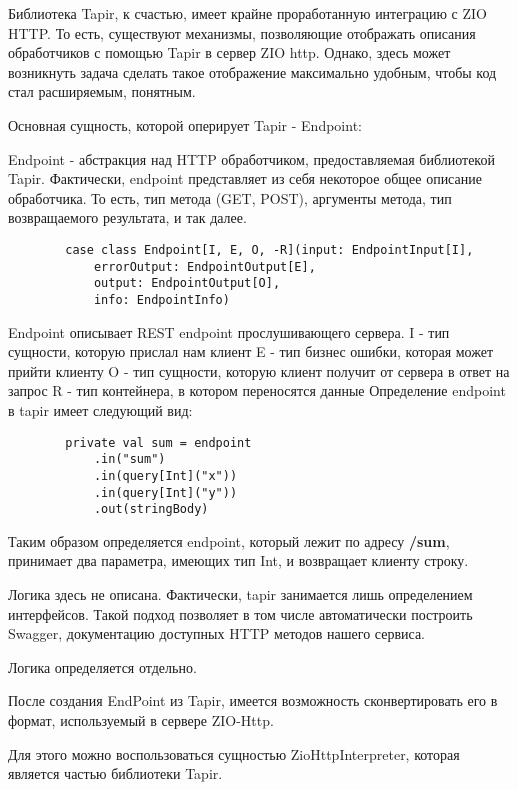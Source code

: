 \documentclass[14pt]{extarticle}
\begin{document}
    Библиотека Tapir, к счастью, имеет крайне проработанную интеграцию с ZIO HTTP. То есть, существуют механизмы, позволяющие
    отображать описания обработчиков с помощью Tapir в сервер ZIO http. Однако, здесь может возникнуть задача сделать такое отображение
    максимально удобным, чтобы код стал расширяемым, понятным.

    Основная сущность, которой оперирует Tapir - Endpoint:

    Endpoint - абстракция над HTTP обработчиком, предоставляемая библиотекой Tapir. Фактически, endpoint представляет из себя
    некоторое общее описание обработчика. То есть, тип метода (GET, POST), аргументы метода, тип возвращаемого результата, и так далее.

    \begin{verbatim}
        case class Endpoint[I, E, O, -R](input: EndpointInput[I],
            errorOutput: EndpointOutput[E],
            output: EndpointOutput[O],
            info: EndpointInfo)
    \end{verbatim}

    Endpoint описывает REST endpoint прослушивающего сервера.
    I - тип сущности, которую прислал нам клиент
    E - тип бизнес ошибки, которая может прийти клиенту
    O - тип сущности, которую клиент получит от сервера в ответ на запрос
    R - тип контейнера, в котором переносятся данные
    Определение endpoint в tapir имеет следующий вид:
    \begin{verbatim}
        private val sum = endpoint
            .in("sum")
            .in(query[Int]("x"))
            .in(query[Int]("y"))
            .out(stringBody)
    \end{verbatim}

    Таким образом определяется endpoint, который лежит по адресу \textbf{/sum}, принимает два параметра, имеющих тип
    Int, и
    возвращает клиенту строку.

    Логика здесь не описана. Фактически, tapir занимается лишь определением интерфейсов. Такой подход позволяет в том числе
    автоматически построить Swagger, документацию доступных HTTP методов нашего сервиса.

    Логика определяется отдельно.

    После создания EndPoint из Tapir, имеется возможность сконвертировать его в формат,
    используемый в сервере ZIO-Http.

    Для этого можно воспользоваться сущностью ZioHttpInterpreter, которая является частью библиотеки Tapir.
\end{document}
